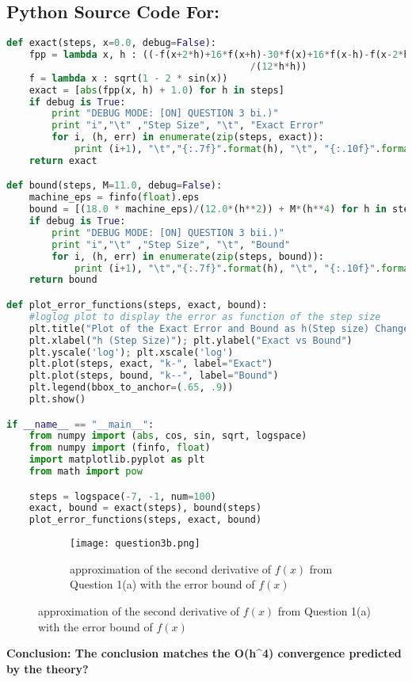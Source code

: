 \documentclass{article}
\begin{document}
\subsection*{Python Source Code For: }
\begin{lstlisting}[language=Python]
def exact(steps, x=0.0, debug=False):
    fpp = lambda x, h : ((-f(x+2*h)+16*f(x+h)-30*f(x)+16*f(x-h)-f(x-2*h))\
                                           /(12*h*h))
    f = lambda x : sqrt(1 - 2 * sin(x))
    exact = [abs(fpp(x, h) + 1.0) for h in steps]
    if debug is True:
        print "DEBUG MODE: [ON] QUESTION 3 bi.)"
        print "i","\t" ,"Step Size", "\t", "Exact Error"
        for i, (h, err) in enumerate(zip(steps, exact)):
            print (i+1), "\t","{:.7f}".format(h), "\t", "{:.10f}".format(err)
    return exact

def bound(steps, M=11.0, debug=False):
    machine_eps = finfo(float).eps
    bound = [(18.0 * machine_eps)/(12.0*(h**2)) + M*(h**4) for h in steps]
    if debug is True:
        print "DEBUG MODE: [ON] QUESTION 3 bii.)"
        print "i","\t" ,"Step Size", "\t", "Bound"
        for i, (h, err) in enumerate(zip(steps, bound)):
            print (i+1), "\t","{:.7f}".format(h), "\t", "{:.10f}".format(err)
    return bound

def plot_error_functions(steps, exact, bound):
    #loglog plot to display the error as function of the step size
    plt.title("Plot of the Exact Error and Bound as h(Step size) Changes")
    plt.xlabel("h (Step Size)"); plt.ylabel("Exact vs Bound")
    plt.yscale('log'); plt.xscale('log')
    plt.plot(steps, exact, "k-", label="Exact")
    plt.plot(steps, bound, "k--", label="Bound")
    plt.legend(bbox_to_anchor=(.65, .9))
    plt.show()

if __name__ == "__main__":
    from numpy import (abs, cos, sin, sqrt, logspace)
    from numpy import (finfo, float)
    import matplotlib.pyplot as plt
    from math import pow

    steps = logspace(-7, -1, num=100)
    exact, bound = exact(steps), bound(steps)
    plot_error_functions(steps, exact, bound)
\end{lstlisting}
\pagebreak
\begin{figure}[h!]
  \centering
  \begin{subfigure}{\linewidth}
    \texttt{[image: question3b.png]}
    \caption{approximation of the second derivative of $f(x)$ from Question 1(a) with the error bound of $f(x)$}
  \end{subfigure}
\end{figure}
\textbf{Conclusion: The conclusion matches the O(h^4) convergence predicted by the theory?}
\pagebreak
\end{document}
